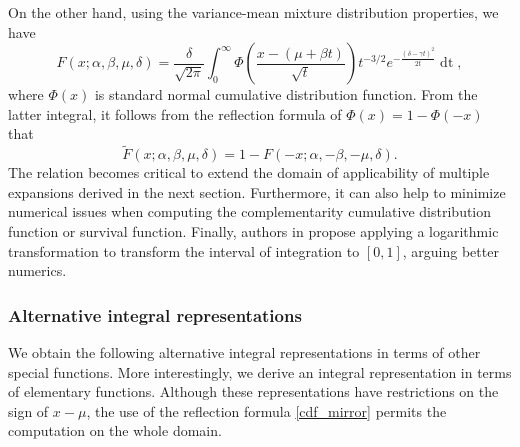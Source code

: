 \documentclass[10pt,a4paper,oneside]{article}
\numberwithin{equation}{section}
\begin{document}
On the other hand, using the variance-mean mixture distribution properties, we have
\begin{equation}\label{integral_phi}
F(x; \alpha, \beta, \mu, \delta) = \frac{\delta}{\sqrt{2\pi}}\int_{0}^{\infty} \Phi\left(\frac{x - (\mu +\beta t)}{\sqrt{t}}\right) t^{-3/2} e^{-\frac{(\delta - \gamma t)^2}{2t}} \mathop{dt},
\end{equation}
where $\Phi(x)$ is standard normal cumulative distribution function. From the latter integral, it follows from the reflection formula of $\Phi(x) = 1 - \Phi(-x)$ that
\begin{equation}\label{cdf_mirror}
\tilde{F}(x; \alpha, \beta, \mu, \delta) = 1- F(-x; \alpha, -\beta, -\mu, \delta).
\end{equation}
The relation becomes critical to extend the domain of applicability of multiple expansions derived in the next section. Furthermore, it can also help to minimize numerical issues when computing the complementarity cumulative distribution function or survival function. Finally, authors in \cite{Kalemanova2007} propose applying a logarithmic transformation to transform the interval of integration to $[0, 1]$, arguing better numerics.

\subsubsection{Alternative integral representations}
We obtain the following alternative integral representations in terms of other special functions. More interestingly, we derive an integral representation in terms of elementary functions. Although these representations have restrictions on the sign of $x-\mu$, the use of the reflection formula \eqref{cdf_mirror} permits the computation on the whole domain.
\end{document}
